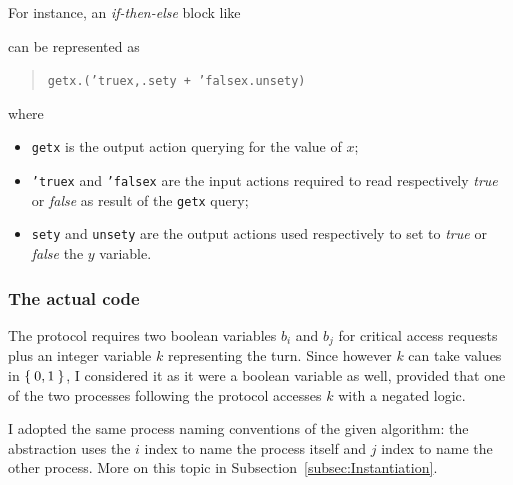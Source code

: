 \documentclass[10pt,a4paper]{article}
\newcommand{\CCSCode}[1]{{\tt #1}}
\begin{document}
            \noindent For instance, an \emph{if-then-else} block like
            \begin{quote}
                \begin{algorithm}[H]
                \end{algorithm}
            \end{quote}
            can be represented as
            \begin{quote}
            \CCSCode{getx.('truex,.sety + 'falsex.unsety)}
            \end{quote}
            where
            \begin{itemize}

            \item   \CCSCode{getx} is the output action querying for the
                    value of $x$;

            \item   \CCSCode{'truex} and \CCSCode{'falsex} are the input
                    actions required to read respectively \emph{true} or
                    \emph{false} as result of the \CCSCode{getx} query;

            \item   \CCSCode{sety} and \CCSCode{unsety} are the output
                    actions used respectively to set to \emph{true} or
                    \emph{false} the $y$ variable.

            \end{itemize}

        \subsubsection{The actual code}
        \label{subsub:ActualCode}

            The protocol requires two boolean variables $b_i$ and $b_j$
            for critical access requests plus an integer variable $k$
            representing the turn. Since however $k$ can take values in
            $\Set{0, 1}$, I considered it as it were a boolean variable as
            well, provided that one of the two processes following the
            protocol accesses $k$ with a negated logic.

            I adopted the same process naming conventions of the given
            algorithm: the abstraction uses the $i$ index to name the
            process itself and $j$ index to name the other process. More
            on this topic in Subsection~\ref{subsec:Instantiation}.
\end{document}
